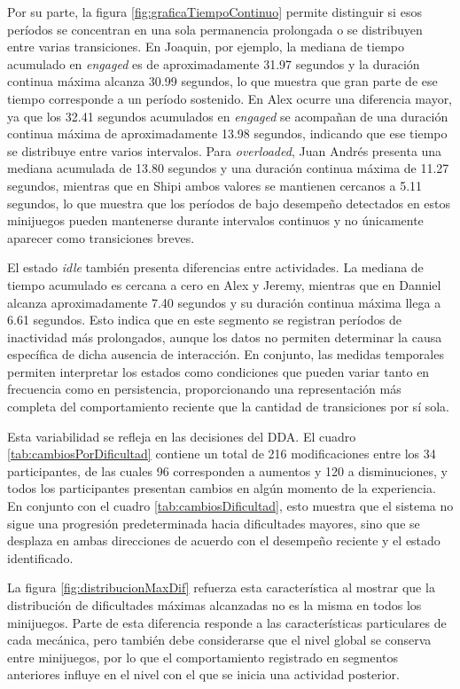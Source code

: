 Por su parte, la figura \ref{fig:graficaTiempoContinuo} 
permite distinguir si esos períodos se concentran en una sola permanencia 
prolongada o se distribuyen entre varias transiciones. En Joaquin, por 
ejemplo, la mediana de tiempo acumulado en \textit{engaged} es de 
aproximadamente 31.97 segundos y la duración continua máxima alcanza 30.99 
segundos, lo que muestra que gran parte de ese tiempo corresponde a un 
período sostenido. En Alex ocurre una diferencia mayor, ya que los 32.41 
segundos acumulados en \textit{engaged} se acompañan de una duración 
continua máxima de aproximadamente 13.98 segundos, indicando que ese 
tiempo se distribuye entre varios intervalos. Para \textit{overloaded}, 
Juan Andrés presenta una mediana acumulada de 13.80 segundos y una 
duración continua máxima de 11.27 segundos, mientras que en Shipi ambos 
valores se mantienen cercanos a 5.11 segundos, lo que muestra que los 
períodos de bajo desempeño detectados en estos minijuegos pueden 
mantenerse durante intervalos continuos y no únicamente aparecer como 
transiciones breves.

El estado \textit{idle} también presenta diferencias entre actividades. 
La mediana de tiempo acumulado es cercana a cero en Alex y Jeremy, 
mientras que en Danniel alcanza aproximadamente 7.40 segundos y su 
duración continua máxima llega a 6.61 segundos. Esto indica que en este 
segmento se registran períodos de inactividad más prolongados, aunque 
los datos no permiten determinar la causa específica de dicha ausencia de 
interacción. En conjunto, las medidas temporales permiten interpretar los 
estados como condiciones que pueden variar tanto en frecuencia como en 
persistencia, proporcionando una representación más completa del 
comportamiento reciente que la cantidad de transiciones por sí sola.

Esta variabilidad se refleja en las decisiones del DDA. El cuadro 
\ref{tab:cambiosPorDificultad} contiene un total de 216 modificaciones entre los 34
participantes, de las cuales 96 corresponden a aumentos y 120 a 
disminuciones, y todos los participantes presentan cambios en algún
momento de la experiencia. En conjunto con el cuadro 
\ref{tab:cambiosDificultad}, esto muestra que el sistema no sigue una progresión
predeterminada hacia dificultades mayores, sino que se desplaza en ambas direcciones
de acuerdo con el desempeño reciente y el estado identificado.

La figura \ref{fig:distribucionMaxDif} refuerza esta característica al 
mostrar que la distribución de dificultades máximas alcanzadas no es la 
misma en todos los minijuegos. Parte de esta diferencia responde a las 
características particulares de cada mecánica, pero también debe 
considerarse que el nivel global se conserva entre minijuegos, por lo que 
el comportamiento registrado en segmentos anteriores influye en el nivel 
con el que se inicia una actividad posterior.

